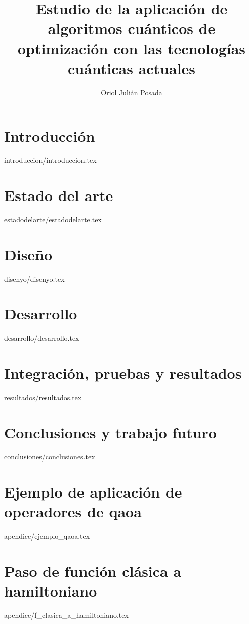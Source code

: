 \documentclass[epsbased,copyright,final,printable,covers,extendedindex,firstnumbered,tfg,lof,lot]{tfgtfmthesisuam}
\title[Aplicación de algoritmos cuánticos de optimización con las tecnologías cuánticas actuales]{Estudio de la aplicación de algoritmos cuánticos de optimización con las tecnologías cuánticas actuales}
\author{Oriol Julián Posada}
\begin{document}
\chapter{Introducción\label{cap:introduccion}}{introduccion/introduccion.tex}

\chapter{Estado del arte\label{CAP:ESTADODELARTE}}{estadodelarte/estadodelarte.tex}

\chapter{Diseño\label{CAP:DISEÑO}}{disenyo/disenyo.tex}

\chapter{Desarrollo\label{CAP:DESARROLLO}}{desarrollo/desarrollo.tex}

\chapter{Integración, pruebas y resultados\label{CAP:RESULTADOS}}{resultados/resultados.tex}

\chapter{Conclusiones y trabajo futuro\label{CAP:CONCLUSIONES}}{conclusiones/conclusiones.tex}



\newpage
{}




\appendix

\chapter{Ejemplo de aplicación de operadores de qaoa\label{CAP:EJEMPLO_QAOA}}{apendice/ejemplo_qaoa.tex}
\chapter{Paso de función clásica a hamiltoniano\label{CAP:F_CLASICA_A_HAMILTONIANO}}{apendice/f_clasica_a_hamiltoniano.tex}
\end{document}
